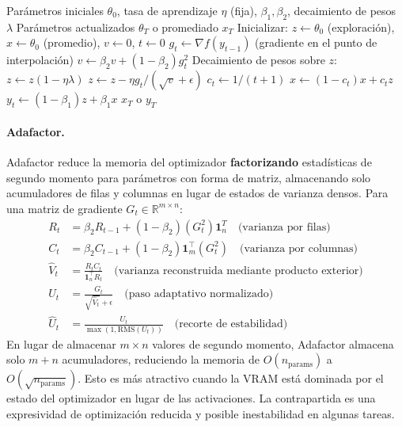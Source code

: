 \begin{algorithm}[H]
\caption{Schedule-Free AdamW}
\label{alg:schedulefree}
\begin{algorithmic}[1]
\Require Parámetros iniciales $\theta_0$, tasa de aprendizaje $\eta$ (fija), $\beta_1, \beta_2$, decaimiento de pesos $\lambda$
\Ensure Parámetros actualizados $\theta_T$ o promediado $x_T$
\State Inicializar: $z \gets \theta_0$ (exploración), $x \gets \theta_0$ (promedio), $v \gets 0$, $t \gets 0$
    \State $g_t \gets \nabla f(y_{t-1})$ (gradiente en el punto de interpolación)
    \State $v \gets \beta_2 v + (1-\beta_2) g_t^2$ 
    \State Decaimiento de pesos sobre $z$: $z \gets z(1 - \eta\lambda)$
    \State $z \gets z - \eta g_t / (\sqrt{v} + \epsilon)$ 
    \State $c_t \gets 1 / (t+1)$ 
    \State $x \gets (1-c_t) x + c_t z$ 
    \State $y_t \gets (1-\beta_1) z + \beta_1 x$ 
\EndFor
\Return $x_T$ o $y_T$
\end{algorithmic}
\end{algorithm}

\paragraph{Adafactor.}
Adafactor reduce la memoria del optimizador \textbf{factorizando} estadísticas de segundo momento para parámetros con forma de matriz, almacenando solo acumuladores de filas y columnas en lugar de estados de varianza densos. Para una matriz de gradiente $G_t \in \mathbb{R}^{m \times n}$:
\begin{align}
R_t &= \beta_2 R_{t-1} + (1-\beta_2)(G_t^2) \mathbf{1}_n^T \quad\text{(varianza por filas)} \\
C_t &= \beta_2 C_{t-1} + (1-\beta_2) \mathbf{1}_m^\top (G_t^2) \quad\text{(varianza por columnas)} \\
\hat{V}_t &= \frac{R_t C_t}{\mathbf{1}_n^\top R_t} \quad\text{(varianza reconstruida mediante producto exterior)} \\
U_t &= \frac{G_t}{\sqrt{\hat{V}_t}+\epsilon} \quad\text{(paso adaptativo normalizado)} \\
\hat{U}_t &= \frac{U_t}{\max(1, \text{RMS}(U_t))} \quad\text{(recorte de estabilidad)}
\end{align}
En lugar de almacenar $m \times n$ valores de segundo momento, Adafactor almacena solo $m + n$ acumuladores, reduciendo la memoria de $O(n_{\text{params}})$ a $O(\sqrt{n_{\text{params}}})$. Esto es más atractivo cuando la VRAM está dominada por el estado del optimizador en lugar de las activaciones. La contrapartida es una expresividad de optimización reducida y posible inestabilidad en algunas tareas.

